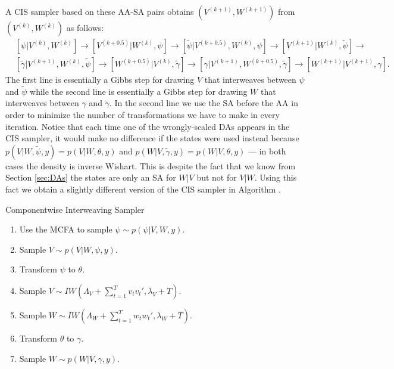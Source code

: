 \documentclass[12pt]{article}
\begin{document}
A CIS sampler based on these AA-SA pairs obtains $(V^{(k+1)},W^{(k+1)})$ from $(V^{(k)},W^{(k)})$ as follows:
\begin{align*}
&[\psi|V^{(k)},W^{(k)}] \to [V^{(k+0.5)}|W^{(k)},\psi] \to [\tilde{\psi}|V^{(k+0.5)},W^{(k)},\psi] \to [V^{(k+1)}|W^{(k)},\tilde{\psi}]\to\\
&[\tilde{\gamma}|V^{(k+1)},W^{(k)},\tilde{\psi}] \to [W^{(k+0.5)}|V^{(k)},\tilde{\gamma}] \to [\gamma|V^{(k+1)},W^{(k+0.5)},\tilde{\gamma}]\to [W^{(k+1)}|V^{(k+1)},\gamma].
\end{align*}
The first line is essentially a Gibbs step for drawing $V$ that interweaves between $\psi$ and $\tilde{\psi}$ while the second line is essentially a Gibbs step for drawing $W$ that interweaves between $\gamma$ and $\tilde{\gamma}$. In the second line we use the SA before the AA in order to minimize the number of transformations we have to make in every iteration. Notice that each time one of the wrongly-scaled DAs appears in the CIS sampler, it would make no difference if the states were used instead because $p(V|W,\tilde{\psi},y)=p(V|W,\theta,y)$ and $p(W|V,\tilde{\gamma},y)=p(W|V,\theta,y)$ --- in both cases the density is inverse Wishart. This is despite the fact that we know from Section \ref{sec:DAs} the states are only an SA for $W|V$ but not for $V|W$. Using this fact we obtain a slightly different version of the CIS sampler in Algorithm .
\begin{alg*}[CIS]Componentwise Interweaving Sampler\label{alg:DLMcis}
\begin{enumerate}
\item Use the MCFA to sample $\psi \sim p(\psi|V,W,y)$.
\item Sample $V \sim p(V|W,\psi,y)$.
\item Transform $\psi$ to $\theta$.
\item Sample $V \sim IW\left(\Lambda_V + \sum_{t=1}^Tv_tv_t',\lambda_V + T\right)$.
\item Sample $W \sim IW\left(\Lambda_W + \sum_{t=1}^Tw_tw_t',\lambda_{W} + T\right)$.
\item Transform $\theta$ to $\gamma$.
\item Sample $W \sim p(W|V,\gamma,y)$.
\end{enumerate}
\end{alg*}
\end{document}
